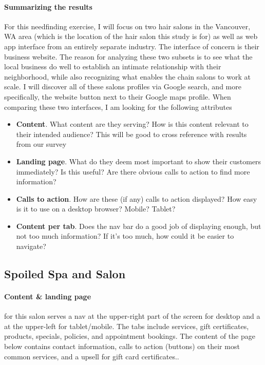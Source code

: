 \paragraph{Summarizing the results}
For this needfinding exercise, I will focus on two hair salons in the Vancouver, WA area (which is the location of the hair salon this study is for) as well as web app interface from an entirely separate industry. The interface of concern is their business website. The reason for analyzing these two subsets is to see what the local business do well to establish an intimate relationship with their neighborhood, while also recognizing what enables the chain salons to work at scale. I will discover all of these salons profiles via Google search, and more specifically, the website button next to their Google maps profile. When comparing these two interfaces, I am looking for the following attributes
\begin{itemize}
\item
  \textbf{Content}. What content are they serving? How is this content relevant to their intended audience? This will be good to cross reference with results from our survey
\item
  \textbf{Landing page}. What do they deem most important to show their customers immediately? Is this useful? Are there obvious calls to action to find more information?
\item
  \textbf{Calls to action}. How are these (if any) calls to action displayed? How easy is it to use on a desktop browser? Mobile? Tablet?
\item
  \textbf{Content per tab}. Does the nav bar do a good job of displaying enough, but not too much information? If it's too much, how could it be easier to navigate?
\end{itemize}

\subsection{Spoiled Spa and Salon}

\paragraph{Content & landing page}
for this salon serves a nav at the upper-right part of the screen for desktop and a  at the upper-left for tablet/mobile. The tabs include services, gift certificates, products, specials, policies, and appointment bookings. The content of the page below contains contact information, calls to action (buttons) on their most common services, and a upsell for gift card certificates..

